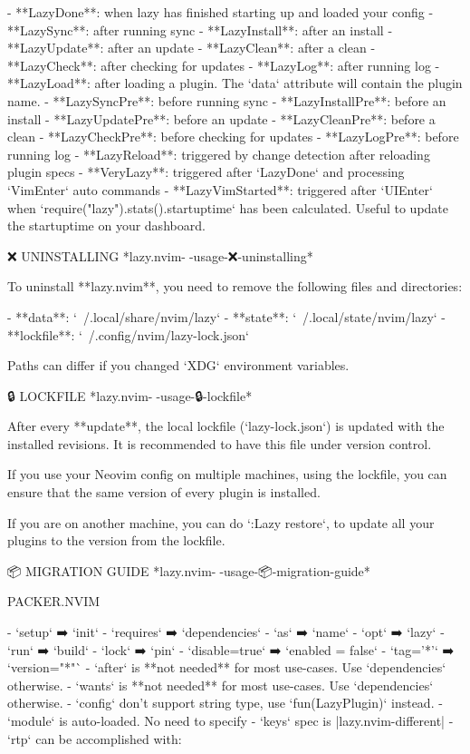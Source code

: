 \begin{listing}
- **LazyDone**: when lazy has finished starting up and loaded your config
- **LazySync**: after running sync
- **LazyInstall**: after an install
- **LazyUpdate**: after an update
- **LazyClean**: after a clean
- **LazyCheck**: after checking for updates
- **LazyLog**: after running log
- **LazyLoad**: after loading a plugin. The `data` attribute will contain the plugin name.
- **LazySyncPre**: before running sync
- **LazyInstallPre**: before an install
- **LazyUpdatePre**: before an update
- **LazyCleanPre**: before a clean
- **LazyCheckPre**: before checking for updates
- **LazyLogPre**: before running log
- **LazyReload**: triggered by change detection after reloading plugin specs
- **VeryLazy**: triggered after `LazyDone` and processing `VimEnter` auto commands
- **LazyVimStarted**: triggered after `UIEnter` when `require("lazy").stats().startuptime` has been calculated.
    Useful to update the startuptime on your dashboard.


❌ UNINSTALLING                       *lazy.nvim-🚀-usage-❌-uninstalling*

To uninstall **lazy.nvim**, you need to remove the following files and
directories:

- **data**: `~/.local/share/nvim/lazy`
- **state**: `~/.local/state/nvim/lazy`
- **lockfile**: `~/.config/nvim/lazy-lock.json`


  Paths can differ if you changed `XDG` environment variables.

🔒 LOCKFILE                             *lazy.nvim-🚀-usage-🔒-lockfile*

After every **update**, the local lockfile (`lazy-lock.json`) is updated with
the installed revisions. It is recommended to have this file under version
control.

If you use your Neovim config on multiple machines, using the lockfile, you can
ensure that the same version of every plugin is installed.

If you are on another machine, you can do `:Lazy restore`, to update all your
plugins to the version from the lockfile.


📦 MIGRATION GUIDE               *lazy.nvim-🚀-usage-📦-migration-guide*


PACKER.NVIM ~

- `setup` ➡️ `init`
- `requires` ➡️ `dependencies`
- `as` ➡️ `name`
- `opt` ➡️ `lazy`
- `run` ➡️ `build`
- `lock` ➡️ `pin`
- `disable=true` ➡️ `enabled = false`
- `tag='*'` ➡️ `version="*"`
- `after` is **not needed** for most use-cases. Use `dependencies` otherwise.
- `wants` is **not needed** for most use-cases. Use `dependencies` otherwise.
- `config` don’t support string type, use `fun(LazyPlugin)` instead.
- `module` is auto-loaded. No need to specify
- `keys` spec is |lazy.nvim-different|
- `rtp` can be accomplished with:


\end{listing}

